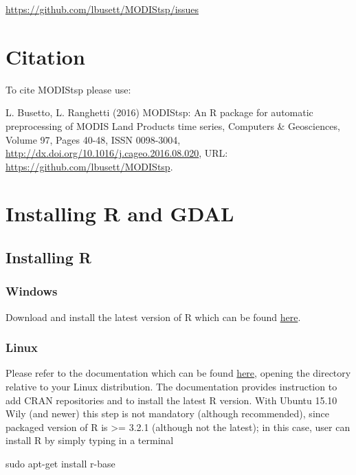 \documentclass[]{article}
\newenvironment{Shaded}{\begin{snugshade}}{\end{snugshade}}
\newcommand{\FunctionTok}[1]{\textcolor[rgb]{0.00,0.00,0.00}{#1}}
\newcommand{\NormalTok}[1]{#1}
\begin{document}
\url{https://github.com/lbusett/MODIStsp/issues}

\section{Citation}\label{citation}

To cite MODIStsp please use:

L. Busetto, L. Ranghetti (2016) MODIStsp: An R package for automatic
preprocessing of MODIS Land Products time series, Computers \&
Geosciences, Volume 97, Pages 40-48, ISSN 0098-3004,
\url{http://dx.doi.org/10.1016/j.cageo.2016.08.020}, URL:
\url{https://github.com/lbusett/MODIStsp}.

\hypertarget{installing-r-and-gdal}{\section{Installing R and
GDAL}\label{installing-r-and-gdal}}

\subsection{Installing R}\label{installing-r}

\subsubsection{Windows}\label{windows}

Download and install the latest version of R which can be found
\href{https://cran.r-project.org/bin/windows/base}{here}.

\subsubsection{Linux}\label{linux}

Please refer to the documentation which can be found
\href{https://cran.r-project.org/bin/linux}{here}, opening the directory
relative to your Linux distribution. The documentation provides
instruction to add CRAN repositories and to install the latest R
version. With Ubuntu 15.10 Wily (and newer) this step is not mandatory
(although recommended), since packaged version of R is \textgreater{}=
3.2.1 (although not the latest); in this case, user can install R by
simply typing in a terminal

\begin{Shaded}
\begin{Highlighting}[]
\FunctionTok{sudo}\NormalTok{ apt-get install r-base}
\end{Highlighting}
\end{Shaded}
\end{document}

